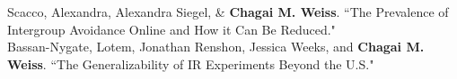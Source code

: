 \documentclass[11pt]{article}
\begin{document}
Scacco, Alexandra, Alexandra Siegel, \& \textbf{Chagai M. Weiss}. ``The Prevalence of Intergroup Avoidance Online and How it Can Be Reduced."\\

Bassan-Nygate, Lotem, Jonathan Renshon, Jessica Weeks, and \textbf{Chagai M. Weiss}. ``The Generalizability of IR Experiments Beyond the U.S." 
 

               

 
     
                       

\end{document}
